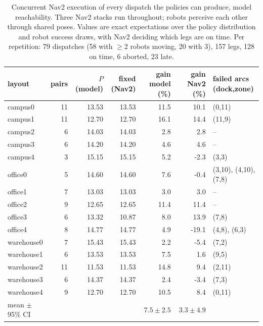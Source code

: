\begin{table}[h]\centering\caption{Concurrent Nav2 execution of every dispatch the policies can produce, model reachability. Three Nav2 stacks run throughout; robots perceive each other through shared poses. Values are exact expectations over the policy distribution and robot success draws, with Nav2 deciding which legs are on time. Per repetition: 79 dispatches (58 with $\ge$2 robots moving, 20 with 3), 157 legs, 128 on time, 6 aborted, 23 late.}\label{tab:s-exact-model}\scriptsize
\begin{tabular}{@{}lrrrrrl@{}}\toprule layout & pairs & $P$ (model) & fixed (Nav2) & gain model (\%) & gain Nav2 (\%) & failed arcs (dock,zone)\\\midrule
campus0 & 11 & 13.53 & 13.53 & 11.5 & 10.1 & (0,11)\\
campus1 & 11 & 12.70 & 12.70 & 16.1 & 14.4 & (11,9)\\
campus2 & 6 & 14.03 & 14.03 & 2.8 & 2.8 & --\\
campus3 & 6 & 14.20 & 14.20 & 4.6 & 4.6 & --\\
campus4 & 3 & 15.15 & 15.15 & 5.2 & -2.3 & (3,3)\\
office0 & 5 & 14.60 & 14.60 & 7.6 & -0.4 & (3,10), (4,10), (7,8)\\
office1 & 7 & 13.03 & 13.03 & 3.0 & 3.0 & --\\
office2 & 9 & 12.65 & 12.65 & 11.4 & 11.4 & --\\
office3 & 6 & 13.32 & 10.87 & 8.0 & 13.9 & (7,8)\\
office4 & 8 & 14.77 & 14.77 & 4.9 & -19.1 & (4,8), (6,3)\\
warehouse0 & 7 & 15.43 & 15.43 & 2.2 & -5.4 & (7,2)\\
warehouse1 & 6 & 13.53 & 13.53 & 7.5 & 1.6 & (9,5)\\
warehouse2 & 11 & 11.53 & 11.53 & 14.8 & 9.4 & (2,11)\\
warehouse3 & 6 & 14.37 & 14.37 & 2.4 & -3.4 & (7,3)\\
warehouse4 & 9 & 12.70 & 12.70 & 10.5 & 8.4 & (0,11)\\
\midrule mean $\pm$ 95\% CI & & & & $7.5\pm2.5$ & $3.3\pm4.9$ & \\
\bottomrule\end{tabular}\end{table}
